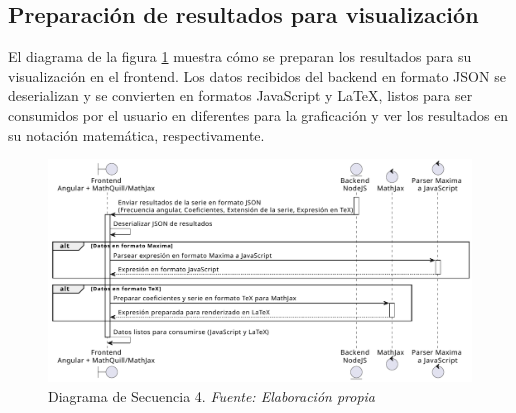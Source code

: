 \subsection{Preparación de resultados para visualización}
El diagrama de  la figura \ref{fig:Diagrama_secuencia_4} muestra cómo se preparan los resultados para su visualización en el frontend. Los datos recibidos del backend en formato JSON se deserializan y se convierten en formatos JavaScript y LaTeX, listos para ser consumidos por el usuario en diferentes para la graficación y ver los resultados en su notación matemática, respectivamente.
\begin{figure}[H]
	\centering
	\includegraphics[width=1\textwidth]{img/chapter04/DS4.pdf}
	\caption[Diagrama de Secuencia 4.]{Diagrama de Secuencia 4. \textit{Fuente: \textit{Elaboración propia}}}
	\label{fig:Diagrama_secuencia_4}
\end{figure}

\newpage

